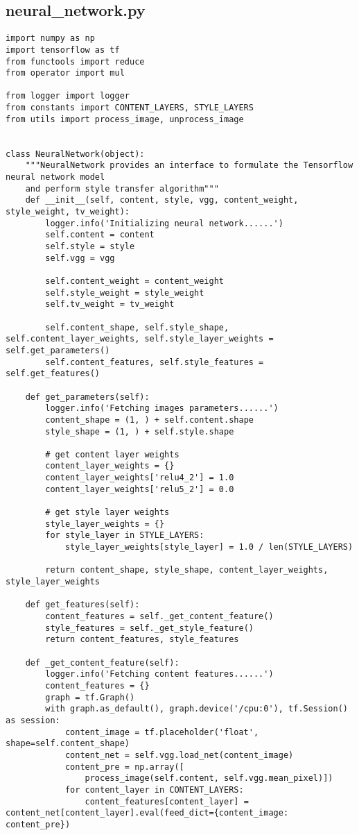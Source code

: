 \newpage
\begin{spacing}{1}
\section{neural\_network.py}
\label{sec:code:nn}
\begin{lstlisting}
import numpy as np
import tensorflow as tf
from functools import reduce
from operator import mul

from logger import logger
from constants import CONTENT_LAYERS, STYLE_LAYERS
from utils import process_image, unprocess_image


class NeuralNetwork(object):
    """NeuralNetwork provides an interface to formulate the Tensorflow neural network model
    and perform style transfer algorithm"""
    def __init__(self, content, style, vgg, content_weight, style_weight, tv_weight):
        logger.info('Initializing neural network......')
        self.content = content
        self.style = style
        self.vgg = vgg

        self.content_weight = content_weight
        self.style_weight = style_weight
        self.tv_weight = tv_weight

        self.content_shape, self.style_shape, self.content_layer_weights, self.style_layer_weights = self.get_parameters()
        self.content_features, self.style_features = self.get_features()

    def get_parameters(self):
        logger.info('Fetching images parameters......')
        content_shape = (1, ) + self.content.shape
        style_shape = (1, ) + self.style.shape

        # get content layer weights
        content_layer_weights = {}
        content_layer_weights['relu4_2'] = 1.0
        content_layer_weights['relu5_2'] = 0.0

        # get style layer weights
        style_layer_weights = {}
        for style_layer in STYLE_LAYERS:
            style_layer_weights[style_layer] = 1.0 / len(STYLE_LAYERS)

        return content_shape, style_shape, content_layer_weights, style_layer_weights

    def get_features(self):
        content_features = self._get_content_feature()
        style_features = self._get_style_feature()
        return content_features, style_features

    def _get_content_feature(self):
        logger.info('Fetching content features......')
        content_features = {}
        graph = tf.Graph()
        with graph.as_default(), graph.device('/cpu:0'), tf.Session() as session:
            content_image = tf.placeholder('float', shape=self.content_shape)
            content_net = self.vgg.load_net(content_image)
            content_pre = np.array([
                process_image(self.content, self.vgg.mean_pixel)])
            for content_layer in CONTENT_LAYERS:
                content_features[content_layer] = content_net[content_layer].eval(feed_dict={content_image: content_pre})


\end{lstlisting}
\end{spacing}
